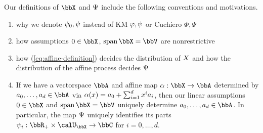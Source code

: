 \begin{remark}
  \label{remark:affine-remarks}
  Our definitions of $\stateSpace$ and $\Psi$ include the following conventions and motivations.
  \begin{enumerate}[label=(\alph*)]
    \item
      {\color{gray} why we denote $\psi_0, \psi$ instead of KM $\varphi, \psi$ or Cuchiero $\Phi, \Psi$}
    \item
      {\color{gray} how assumptions $0 \in \stateSpace$, $\operatorname{span}\stateSpace = \vecSpace$ are nonrestrictive}
    \item
      {\color{gray} how (\ref{eq:affine-definition}) decides the distribution of $X$ and how the distribution of the affine process decides $\Psi$}
    \item
      \label{remark:affine-parts}
      If we have a vectorspace $\bbA$ and affine map $\alpha: \stateSpace \rightarrow \bbA$ determined by $a_0, \ldots, a_d \in \bbA$ via $\alpha(x) = a_0 + \sum_{i=1}^d x^i a_i$, then our linear assumptions $0 \in \stateSpace$ and $\operatorname{span}\stateSpace = \vecSpace$ uniquely determine $a_0, \ldots, a_d \in \bbA$.
      In particular, the map $\Psi$ uniquely identifies its parts $\affPart_i: \bbR_+ \times \boundedSpace \rightarrow \bbC$ for $i=0,\ldots,d$.
  \end{enumerate}
\end{remark}
